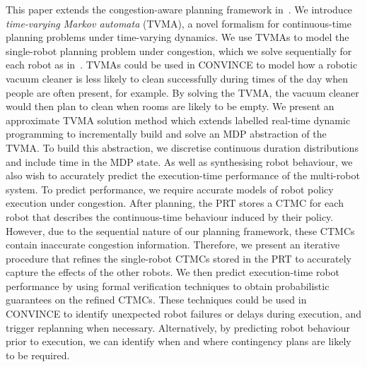 \documentclass[12pt]{article}
\begin{document}
\begin{enumerate}
This paper extends the congestion-aware planning framework in~\cite{street2020multi}.
%
We introduce \emph{time-varying Markov automata} (TVMA), a novel formalism for continuous-time planning problems under time-varying dynamics.
%
We use TVMAs to model the single-robot planning problem under congestion, which we solve sequentially for each robot as in~\cite{street2020multi}.
%
TVMAs could be used in CONVINCE to model how a robotic vacuum cleaner is less likely to clean successfully during times of the day when people are often present, for example.
%
By solving the TVMA, the vacuum cleaner would then plan to clean when rooms are likely to be empty.
%
We present an approximate TVMA solution method which extends labelled real-time dynamic programming to incrementally build and solve an MDP abstraction of the TVMA.
%
To build this abstraction, we discretise continuous duration distributions and include time in the MDP state.
%
As well as synthesising robot behaviour, we also wish to accurately predict the execution-time performance of the multi-robot system.
%
To predict performance, we require accurate models of robot policy execution under congestion.
%
After planning, the PRT stores a CTMC for each robot that describes the continuous-time behaviour induced by their policy.
%
However, due to the sequential nature of our planning framework, these CTMCs contain inaccurate congestion information.
%
Therefore, we present an iterative procedure that refines the single-robot CTMCs stored in the PRT to accurately capture the effects of the other robots. 
%
We then predict execution-time robot performance by using formal verification techniques to obtain probabilistic guarantees on the refined CTMCs.
%
These techniques could be used in CONVINCE to identify unexpected robot failures or delays during execution, and trigger replanning when necessary.
%
Alternatively, by predicting robot behaviour prior to execution, we can identify when and where contingency plans are likely to be required.


\end{enumerate}
\end{document}
